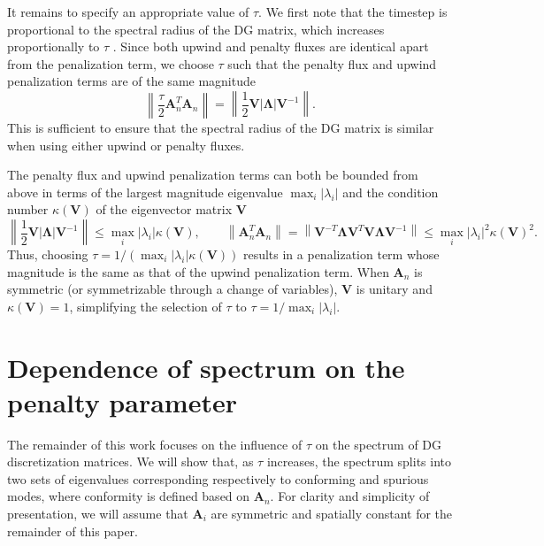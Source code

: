 \documentclass[preprint,10pt]{elsarticle}
\newcommand{\nor}[1]{\left\| #1 \right\|}
\newcommand{\LRp}[1]{\left( #1 \right)}
\newcommand{\LRb}[1]{\left| #1 \right|}
\newcommand{\note}[1]{{\color{blue}#1}}
\begin{document}
\note{It remains to specify an appropriate value of $\tau$.  We first note that the timestep is proportional to the spectral radius of the DG matrix, which increases proportionally to $\tau$ \cite{chan2015gpu}.  Since both upwind and penalty fluxes are identical apart from the penalization term, we choose $\tau$ such that the penalty flux and upwind penalization terms are of the same magnitude 
\[
\nor{\frac{\tau}{2} \bm{A}_n^T\bm{A}_n} = \nor{\frac{1}{2}\bm{V}\LRb{\bm{\Lambda}}{\bm{V}^{-1}}}.
\]
This is sufficient to ensure that the spectral radius of the DG matrix is similar when using either upwind or penalty fluxes.  

The penalty flux and upwind penalization terms can both be bounded from above in terms of the largest magnitude eigenvalue $\max_i\LRb{\lambda_i}$ and the condition number $\kappa\LRp{\bm{V}}$ of the eigenvector matrix $\bm{V}$
\[
\nor{\frac{1}{2}\bm{V}\LRb{\bm{\Lambda}}{\bm{V}^{-1}}} \leq \max_i \LRb{\lambda_i} \kappa\LRp{\bm{V}}, \qquad \nor{\bm{A}_n^T\bm{A}_n} = \nor{\bm{V}^{-T}\bm{\Lambda}\bm{V}^T \bm{V}\bm{\Lambda}\bm{V}^{-1}} \leq \max_i\LRb{\lambda_i}^2\kappa\LRp{\bm{V}}^2.
\]
Thus, choosing $\tau = 1/\LRp{\max_i\LRb{\lambda_i}\kappa\LRp{\bm{V}}}$ results in a penalization term whose magnitude is the same as that of the upwind penalization term.  When $\bm{A}_n$ is symmetric (or symmetrizable through a change of variables), $\bm{V}$ is unitary and $\kappa\LRp{\bm{V}} = 1$, simplifying the selection of $\tau$ to $\tau = 1/\max_i\LRb{\lambda_i}$.  
}


\section{Dependence of \note{spectrum} on the penalty parameter}
\label{sec:spec}
The remainder of this work focuses on the influence of $\tau$ on the \note{spectrum} of DG discretization matrices.  We will show that, as $\tau$ increases, the \note{spectrum} splits into two sets of eigenvalues corresponding respectively to conforming and spurious modes, where conformity is defined based on $\bm{A}_n$.  \note{For clarity and simplicity of presentation, we will assume that $\bm{A}_i$ are symmetric and spatially constant for the remainder of this paper.  }%
\end{document}
